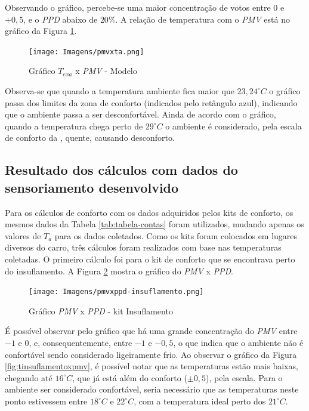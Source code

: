 \documentclass[acronym,symbols,table]{fei}
\begin{document}
Observando o gráfico, percebe-se uma maior concentração de votos entre $0$ e $+0,5$, e o \textit{PPD} abaixo de $20\%$. A relação de temperatura com o \textit{PMV} está no gráfico da Figura \ref{fig:ta-ppd-metro}.

\begin{figure}[!htb]
    \centering
    \caption{Gráfico $T_{exa}$ x \textit{PMV} - Modelo}
    \texttt{[image: Imagens/pmvxta.png]}
    \label{fig:ta-ppd-metro}
\end{figure}

Observa-se que quando a temperatura ambiente fica maior que $23,24^\circ C$ o gráfico passa dos limites da zona de conforto (indicados pelo retângulo azul), indicando que o ambiente passa a ser desconfortável. Ainda de acordo com o gráfico, quando a temperatura chega perto de $29^\circ C$ o ambiente é considerado, pela escala de conforto da \textcite{ASHRAE2009}, quente, causando desconforto.

\subsection{Resultado dos cálculos com dados do sensoriamento desenvolvido}

Para os cálculos de conforto com os dados adquiridos pelos kits de conforto, os mesmos dados da Tabela \ref{tab:tabela-contas} foram utilizados, mudando apenas os valores de $T_{a}$ para os dados coletados. Como os kits foram colocados em lugares diversos do carro, três cálculos foram realizados com base nas temperaturas coletadas. O primeiro cálculo foi para o kit de conforto que se encontrava perto do insuflamento. A Figura \ref{fig:pmv-ppd-insuflamento} mostra o gráfico do \textit{PMV} x \textit{PPD}.

\begin{figure}[!htb]
    \centering
    \caption{Gráfico \textit{PMV} x \textit{PPD} - kit Insuflamento}
    \texttt{[image: Imagens/pmvxppd-insuflamento.png]}
    \label{fig:pmv-ppd-insuflamento}
\end{figure}


É possível observar pelo gráfico que há uma grande concentração do \textit{PMV} entre $-1$ e $0$, e, consequentemente, entre $-1$ e $-0,5$, o que indica que o ambiente não é confortável sendo considerado ligeiramente frio. 
\newpage
Ao observar o gráfico da Figura \ref{fig:tinsuflamentoxpmv}, é possível notar que as temperaturas estão mais baixas, chegando até $16^\circ C$, que já está além do conforto ($\pm 0,5$), pela escala. Para o ambiente ser considerado confortável, seria necessário que as temperaturas neste ponto estivessem entre $18^\circ C$ e $22^\circ C$, com a temperatura ideal perto dos $21^\circ C$.
\end{document}
